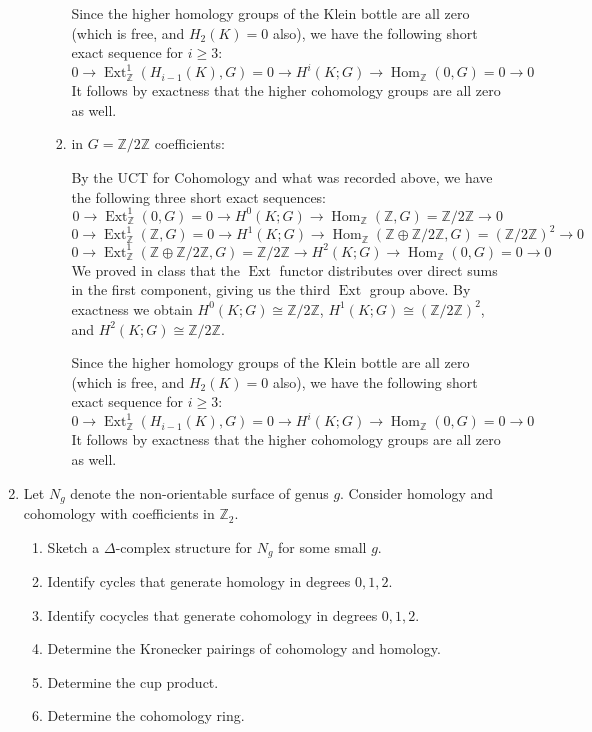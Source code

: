 \documentclass[11pt]{article}
\DeclareMathOperator{\Hom}{Hom}
\DeclareMathOperator{\Ext}{Ext}
\begin{document}
\begin{enumerate}
\begin{enumerate}
\begin{enumerate}
        Since the higher homology groups of the Klein bottle are all zero (which is free, and $H_2(K)=0$ also), we have the following short exact sequence for $i\geq 3$: \[0\to \Ext_\mathbb{Z}^1(H_{i-1}(K), G)=0\to H^i(K;G)\to \Hom_\mathbb{Z}(0,G)=0\to 0\] It follows by exactness that the higher cohomology groups are all zero as well.
        \item in $G=\mathbb{Z}/2\mathbb{Z}$ coefficients:
        
        By the UCT for Cohomology and what was recorded above, we have the following three short exact sequences:
        \[0\to \Ext_\mathbb{Z}^1(0, G)=0\to H^0(K;G)\to \Hom_\mathbb{Z}(\mathbb{Z},G)=\mathbb{Z}/2\mathbb{Z}\to 0\]
        \[0\to \Ext_\mathbb{Z}^1(\mathbb{Z}, G)=0\to H^1(K;G)\to \Hom_\mathbb{Z}(\mathbb{Z}\oplus \mathbb{Z}/2\mathbb{Z},G)=(\mathbb{Z}/2\mathbb{Z})^2\to 0\]
        \[0\to \Ext_\mathbb{Z}^1(\mathbb{Z}\oplus \mathbb{Z}/2\mathbb{Z}, G)= \mathbb{Z}/2\mathbb{Z}\to H^2(K;G)\to \Hom_\mathbb{Z}(0,G)=0\to 0\] 
        We proved in class that the $\Ext$ functor distributes over direct sums in the first component, giving us the third $\Ext$ group above. By exactness we obtain $H^0(K;G)\cong\mathbb{Z}/2\mathbb{Z}$, $H^1(K;G)\cong (\mathbb{Z}/2\mathbb{Z})^2$, and $H^2(K;G)\cong\mathbb{Z}/2\mathbb{Z}$.

        Since the higher homology groups of the Klein bottle are all zero (which is free, and $H_2(K)=0$ also), we have the following short exact sequence for $i\geq 3$: \[0\to \Ext_\mathbb{Z}^1(H_{i-1}(K), G)=0\to H^i(K;G)\to \Hom_\mathbb{Z}(0,G)=0\to 0\] It follows by exactness that the higher cohomology groups are all zero as well.
      \end{enumerate}
    \end{enumerate}
    \item Let $N_g$ denote the non-orientable surface of genus $g$. Consider homology and cohomology with coefficients in $\mathbb{Z}_2$.\begin{enumerate}[label=(\alph*)]
        \item Sketch a $\Delta$-complex structure for $N_g$ for some small $g$.\vspace*{7cm}
        \item Identify cycles that generate homology in degrees $0,1,2$.
        \item Identify cocycles that generate cohomology in degrees $0,1,2$.
        \item Determine the Kronecker pairings of cohomology and homology.
        \item Determine the cup product. 
        \item Determine the cohomology ring.
    \end{enumerate}
\end{enumerate}
\end{document}
